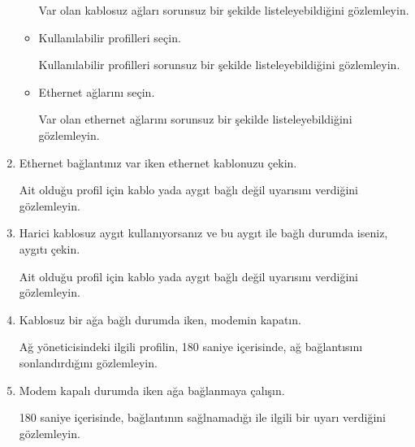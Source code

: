 \documentclass[a4paper,10pt]{article}
\begin{document}
\begin{enumerate}
\begin{itemize}
	 Var olan kablosuz ağları sorunsuz bir şekilde listeleyebildiğini gözlemleyin.
	
 	\item Kullanılabilir profilleri seçin.
	
	Kullanılabilir profilleri sorunsuz bir şekilde listeleyebildiğini gözlemleyin.
	
	\item Ethernet ağlarını seçin.
	
	 Var olan ethernet ağlarını sorunsuz bir şekilde listeleyebildiğini gözlemleyin.
	
	\end{itemize}
	\item Ethernet bağlantınız var iken ethernet kablonuzu çekin.

	Ait olduğu profil için kablo yada aygıt bağlı değil uyarısını verdiğini gözlemleyin.
	\item Harici kablosuz aygıt kullanıyorsanız ve bu aygıt ile bağlı durumda iseniz, aygıtı çekin.

	Ait olduğu profil için kablo yada aygıt bağlı değil uyarısını verdiğini gözlemleyin.

	\item Kablosuz bir ağa bağlı durumda iken, modemin kapatın.

	Ağ yöneticisindeki ilgili profilin, 180 saniye içerisinde, ağ bağlantısını sonlandırdığını gözlemleyin.

	\item Modem kapalı durumda iken ağa bağlanmaya çalışın.

	 180 saniye içerisinde, bağlantının sağlnamadığı ile ilgili bir uyarı verdiğini gözlemleyin.

\end{enumerate}
\end{document}
